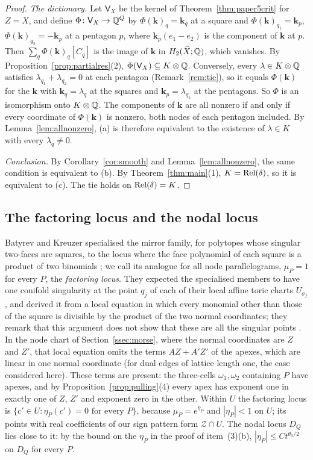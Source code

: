\begin{proof}
\emph{The dictionary.} Let $\mathsf V_X$ be the kernel of Theorem~\ref{thm:paper5crit} for $Z=X$, and define $\Phi\colon \mathsf V_X\to\mathbb Q^Q$ by
$\Phi(\mathbf k)_q=\mathbf k_q$ at a square and $\Phi(\mathbf k)_{q_1}=\mathbf k_p$, $\Phi(\mathbf k)_{q_2}=-\mathbf k_p$ at a pentagon $p$,
where $\mathbf k_p(e_1-e_2)$ is the component of $\mathbf k$ at $p$. Then $\sum_q\Phi(\mathbf k)_q[C_q]$ is the image of $\mathbf k$ in
$H_2(\widehat X;\mathbb Q)$, which vanishes. By Proposition~\ref{prop:partialres}(2), $\Phi(\mathsf V_X)\subseteq K\otimes\mathbb Q$. Conversely, every
$\lambda\in K\otimes\mathbb Q$ satisfies $\lambda_{q_1}+\lambda_{q_2}=0$ at each pentagon (Remark~\ref{rem:tie}), so it equals
$\Phi(\mathbf k)$ for the $\mathbf k$ with $\mathbf k_q=\lambda_q$ at the squares and $\mathbf k_p=\lambda_{q_1}$ at the pentagons. So
$\Phi$ is an isomorphism onto $K\otimes\mathbb Q$. The components of $\mathbf k$ are all nonzero if and only if every coordinate of
$\Phi(\mathbf k)$ is nonzero, both nodes of each pentagon included. By Lemma~\ref{lem:allnonzero}, (a) is therefore equivalent
to the existence of $\lambda\in K$ with every $\lambda_q\neq0$.

\emph{Conclusion.} By Corollary~\ref{cor:smooth} and Lemma~\ref{lem:allnonzero}, the same condition is equivalent to (b).
By Theorem~\ref{thm:main}(1), $K=\operatorname{Rel}(\delta)$, so it is equivalent to (c). The tie holds on $\operatorname{Rel}(\delta)=K$.
\end{proof}

\subsection{The factoring locus and the nodal locus}\label{ssec:periodsremarks}

Batyrev and Kreuzer specialised the mirror family, for polytopes whose singular two-faces are squares, to the locus where
the face polynomial of each square is a product of two binomials \cite[\S3]{BK10}; we call its analogue for all node
parallelograms, $\mu_P=1$ for every $P$, the \emph{factoring locus}. They expected the specialised members to
have one conifold singularity at the point $q_j$ of each of their local affine toric charts $U_{\sigma_j}$, and
derived it from a local equation in which every monomial other than those of the square is divisible by the product
of the two normal coordinates; they remark that this argument does not show that these are all the singular points
\cite[\S3]{BK10}. In the node chart of Section~\ref{ssec:morse}, where the normal coordinates are $Z$ and $Z'$, that local
equation omits the terms $AZ+A'Z'$ of the apexes, which are linear in one normal coordinate (for dual edges of lattice
length one, the case considered here). These terms are present: the
three-cells $\omega_1,\omega_2$ containing $P$ have apexes, and by Proposition~\ref{prop:pulling}(4) every apex has
exponent one in exactly one of $Z$, $Z'$ and exponent zero in the other. Within $U$ the factoring locus
is $\{c'\in U:\eta_P(c')=0\text{ for every }P\}$, because $\mu_P=e^{\eta_P}$ and $|\eta_P|<1$ on $U$; its points with real
coefficients of our sign pattern form $\mathcal Z\cap U$. The nodal locus $D_Q$ lies close to it: by the bound on the
$\eta_P$ in the proof of item~(3)(b), $|\eta_P|\le Ct^{\theta_0/2}$ on $D_Q$ for every $P$.

